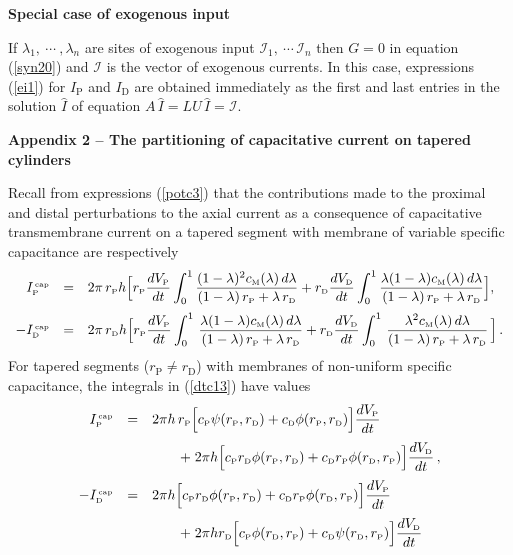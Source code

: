 \textbf{Special case of exogenous input}

If $\lambda_1,\ \cdots\ ,\lambda_n$ are sites of exogenous input
$\mathcal{I}_1,\ \cdots \,\mathcal{I}_n$ then $G=0$ in equation
(\ref{syn20}) and $\mathcal{I}$ is the vector of exogenous
currents. In this case, expressions (\ref{ei1}) for $I_\mathrm{P}$
and $I_\mathrm{D}$ are obtained immediately as the first and last
entries in the solution $\widehat{I}$ of equation
$A\,\widehat{I}=LU\,\widehat{I}=\mathcal{I}$.

\textbf{Appendix 2 -- The partitioning of capacitative current on tapered
cylinders}

Recall from expressions (\ref{potc3}) that the contributions made
to the proximal and distal perturbations to the axial current as a
consequence of capacitative transmembrane current on a tapered
segment with membrane of variable specific capacitance are
respectively
\begin{equation}\label{dtc13}
\begin{array}{rcl}
I^{\mbox{\tiny \,cap}}_{\mbox{\tiny P}} & = & 2\pi\, r_{\mbox{\tiny P}} h
\displaystyle\Big[r_{\mbox{\tiny P}}\frac{dV_{\mbox{\tiny P}}}{dt}
\int_0^1\frac{(1-\lambda)^2 c_{\mbox{\tiny M}}(\lambda)\,d\lambda}
{(1-\lambda)\,r_{\mbox{\tiny P}}+\lambda\,r_{\mbox{\tiny D}}}
+r_{\mbox{\tiny D}}\frac{dV_{\mbox{\tiny D}}}{dt} \int_0^1
\frac{\lambda(1-\lambda)c_{\mbox{\tiny M}}(\lambda)\,d\lambda}
{(1-\lambda)\,r_{\mbox{\tiny P}}+\lambda\,r_{\mbox{\tiny D}}}\Big],\\[12pt]
-I^{\mbox{\tiny \,cap}}_{\mbox{\tiny D}} & = & 2\pi\, r_{\mbox{\tiny D}} h
\displaystyle\Big[r_{\mbox{\tiny P}}\frac{dV_{\mbox{\tiny P}}}{dt}\int_0^1\,
\frac{\lambda(1-\lambda)c_{\mbox{\tiny M}}(\lambda)\,d\lambda}
{(1-\lambda)\,r_{\mbox{\tiny P}}+\lambda\,r_{\mbox{\tiny D}}}+r_{\mbox{\tiny D}}
\frac{dV_{\mbox{\tiny D}}}{dt}\int_0^1\,\frac{\lambda^2
c_{\mbox{\tiny M}}(\lambda)\,d\lambda}
{(1-\lambda)\,r_{\mbox{\tiny P}}+\lambda\,r_{\mbox{\tiny D}}}\,\Big]\,.
\end{array}
\end{equation}
For tapered segments ($r_\mathrm{P}\ne r_\mathrm{D}$) with
membranes of non-uniform specific capacitance, the integrals in
(\ref{dtc13}) have values
\begin{equation}\label{dtc15}
\begin{array}{rcl}
I^{\mbox{\tiny \,cap}}_{\mbox{\tiny P}} & = & \displaystyle2\pi h
\,r_{\mbox{\tiny P}}\Big[c_{\mbox{\tiny P}}\psi(r_{\mbox{\tiny P}},r_{\mbox{\tiny D}})
+c_{\mbox{\tiny D}}\phi(r_{\mbox{\tiny P}},r_{\mbox{\tiny D}})\Big]
\frac{dV_{\mbox{\tiny P}}}{dt}\\[10pt]
&&\qquad\displaystyle+\;2\pi h\Big[c_{\mbox{\tiny P}}r_{\mbox{\tiny D}}
\phi(r_{\mbox{\tiny P}},r_{\mbox{\tiny D}})+c_{\mbox{\tiny D}}r_{\mbox{\tiny P}}
\phi(r_{\mbox{\tiny D}},r_{\mbox{\tiny P}})\Big]\frac{dV_{\mbox{\tiny D}}}{dt}\,,\\[10pt]
-I^{\mbox{\tiny \,cap}}_{\mbox{\tiny D}} & = & \displaystyle2\pi h
\Big[c_{\mbox{\tiny P}}r_{\mbox{\tiny D}}\phi(r_{\mbox{\tiny P}},r_{\mbox{\tiny D}})
+c_{\mbox{\tiny D}}r_{\mbox{\tiny P}}\phi(r_{\mbox{\tiny D}},r_{\mbox{\tiny P}})\Big]
\frac{dV_{\mbox{\tiny P}}}{dt}\\[10pt]
&&\qquad\displaystyle+\;2\pi h r_{\mbox{\tiny D}}\Big[c_{\mbox{\tiny P}}
\phi(r_{\mbox{\tiny D}},r_{\mbox{\tiny P}})+c_{\mbox{\tiny D}}\psi(r_{\mbox{\tiny D}},
r_{\mbox{\tiny P}})\Big]\frac{dV_{\mbox{\tiny D}}}{dt}\nonumber
\end{array}
\end{equation}

